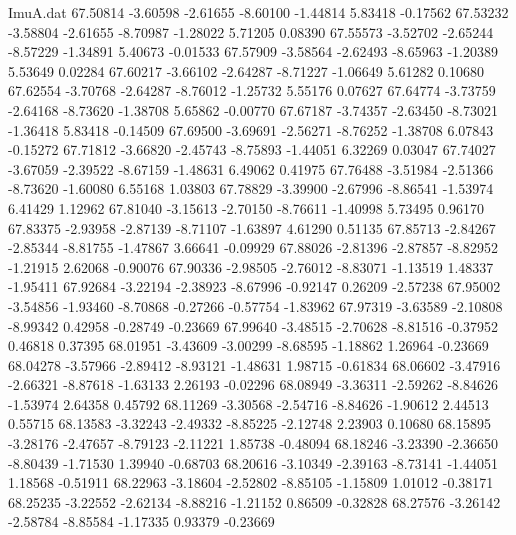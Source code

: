 \begin{filecontents}{ImuA.dat}
  67.50814   -3.60598   -2.61655   -8.60100   -1.44814    5.83418   -0.17562
  67.53232   -3.58804   -2.61655   -8.70987   -1.28022    5.71205    0.08390
  67.55573   -3.52702   -2.65244   -8.57229   -1.34891    5.40673   -0.01533
  67.57909   -3.58564   -2.62493   -8.65963   -1.20389    5.53649    0.02284
  67.60217   -3.66102   -2.64287   -8.71227   -1.06649    5.61282    0.10680
  67.62554   -3.70768   -2.64287   -8.76012   -1.25732    5.55176    0.07627
  67.64774   -3.73759   -2.64168   -8.73620   -1.38708    5.65862   -0.00770
  67.67187   -3.74357   -2.63450   -8.73021   -1.36418    5.83418   -0.14509
  67.69500   -3.69691   -2.56271   -8.76252   -1.38708    6.07843   -0.15272
  67.71812   -3.66820   -2.45743   -8.75893   -1.44051    6.32269    0.03047
  67.74027   -3.67059   -2.39522   -8.67159   -1.48631    6.49062    0.41975
  67.76488   -3.51984   -2.51366   -8.73620   -1.60080    6.55168    1.03803
  67.78829   -3.39900   -2.67996   -8.86541   -1.53974    6.41429    1.12962
  67.81040   -3.15613   -2.70150   -8.76611   -1.40998    5.73495    0.96170
  67.83375   -2.93958   -2.87139   -8.71107   -1.63897    4.61290    0.51135
  67.85713   -2.84267   -2.85344   -8.81755   -1.47867    3.66641   -0.09929
  67.88026   -2.81396   -2.87857   -8.82952   -1.21915    2.62068   -0.90076
  67.90336   -2.98505   -2.76012   -8.83071   -1.13519    1.48337   -1.95411
  67.92684   -3.22194   -2.38923   -8.67996   -0.92147    0.26209   -2.57238
  67.95002   -3.54856   -1.93460   -8.70868   -0.27266   -0.57754   -1.83962
  67.97319   -3.63589   -2.10808   -8.99342    0.42958   -0.28749   -0.23669
  67.99640   -3.48515   -2.70628   -8.81516   -0.37952    0.46818    0.37395
  68.01951   -3.43609   -3.00299   -8.68595   -1.18862    1.26964   -0.23669
  68.04278   -3.57966   -2.89412   -8.93121   -1.48631    1.98715   -0.61834
  68.06602   -3.47916   -2.66321   -8.87618   -1.63133    2.26193   -0.02296
  68.08949   -3.36311   -2.59262   -8.84626   -1.53974    2.64358    0.45792
  68.11269   -3.30568   -2.54716   -8.84626   -1.90612    2.44513    0.55715
  68.13583   -3.32243   -2.49332   -8.85225   -2.12748    2.23903    0.10680
  68.15895   -3.28176   -2.47657   -8.79123   -2.11221    1.85738   -0.48094
  68.18246   -3.23390   -2.36650   -8.80439   -1.71530    1.39940   -0.68703
  68.20616   -3.10349   -2.39163   -8.73141   -1.44051    1.18568   -0.51911
  68.22963   -3.18604   -2.52802   -8.85105   -1.15809    1.01012   -0.38171
  68.25235   -3.22552   -2.62134   -8.88216   -1.21152    0.86509   -0.32828
  68.27576   -3.26142   -2.58784   -8.85584   -1.17335    0.93379   -0.23669

\end{filecontents}
